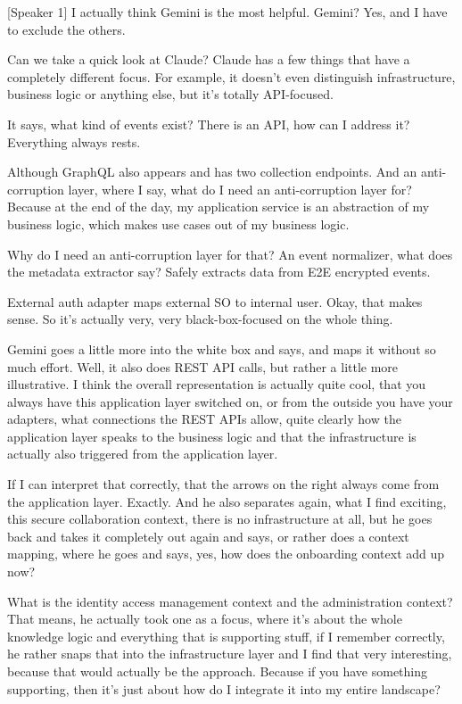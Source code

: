 [Speaker 1]
I actually think Gemini is the most helpful. Gemini? Yes, and I have to exclude the others.

Can we take a quick look at Claude? Claude has a few things that have a completely different focus. For example, it doesn't even distinguish infrastructure, business logic or anything else, but it's totally API-focused.

It says, what kind of events exist? There is an API, how can I address it? Everything always rests.

Although GraphQL also appears and has two collection endpoints. And an anti- corruption layer, where I say, what do I need an anti-corruption layer for? Because at the end of the day, my application service is an abstraction of my business logic, which makes use cases out of my business logic.

Why do I need an anti-corruption layer for that? An event normalizer, what does the metadata extractor say? Safely extracts data from E2E encrypted events.

External auth adapter maps external SO to internal user. Okay, that makes sense. So it's actually very, very black-box-focused on the whole thing.

Gemini goes a little more into the white box and says, and maps it without so much effort. Well, it also does REST API calls, but rather a little more illustrative. I think the overall representation is actually quite cool, that you always have this application layer switched on, or from the outside you have your adapters, what connections the REST APIs allow, quite clearly how the application layer speaks to the business logic and that the infrastructure is actually also triggered from the application layer.

If I can interpret that correctly, that the arrows on the right always come from the application layer. Exactly. And he also separates again, what I find exciting, this secure collaboration context, there is no infrastructure at all, but he goes back and takes it completely out again and says, or rather does a context mapping, where he goes and says, yes, how does the onboarding context add up now?

What is the identity access management context and the administration context? That means, he actually took one as a focus, where it's about the whole knowledge logic and everything that is supporting stuff, if I remember correctly, he rather snaps that into the infrastructure layer and I find that very interesting, because that would actually be the approach. Because if you have something supporting, then it's just about how do I integrate it into my entire landscape?

